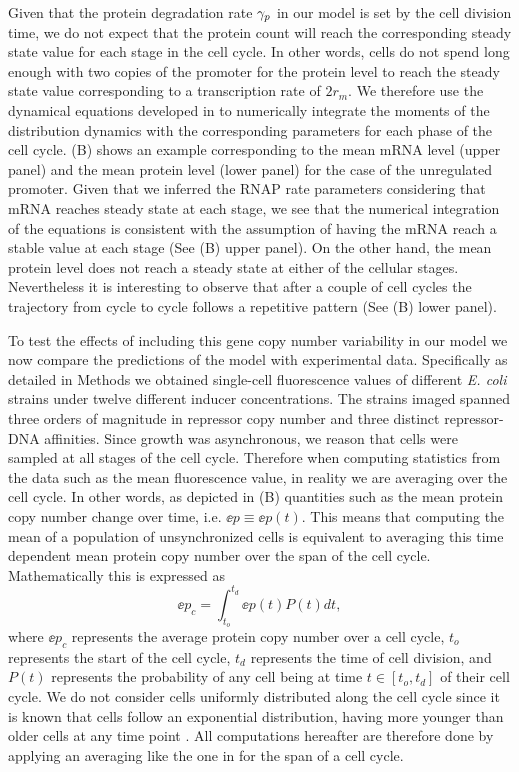 Given that the protein degradation rate $\gamma _p$ in our model is set by the cell
division time, we do not expect that the protein count will reach the
corresponding steady state value for each stage in the cell cycle. In other
words, cells do not spend long enough with two copies of the promoter for the
protein level to reach the steady state value corresponding to a transcription
rate of $2 r_m$. We therefore use the dynamical equations developed in
 to numerically integrate the moments of the distribution
dynamics with the corresponding parameters for each phase of the cell cycle.
(B) shows an example corresponding to the mean mRNA level
(upper panel) and the mean protein level (lower panel) for the case of the
unregulated promoter. Given that we inferred the RNAP rate parameters
considering that mRNA reaches steady state at each stage, we see that the
numerical integration of the equations is consistent with the assumption of
having the mRNA reach a stable value at each stage (See
(B) upper panel). On the other hand, the mean protein
level does not reach a steady state at either of the cellular stages.
Nevertheless it is interesting to observe that after a couple of cell cycles the
trajectory from cycle to cycle follows a repetitive pattern (See
(B) lower panel).

To test the effects of including this gene copy number variability in our model
we now compare the predictions of the model with experimental data. Specifically
as detailed in Methods we obtained single-cell fluorescence values of
different {\it E. coli} strains under twelve different inducer concentrations.
The strains imaged spanned three orders of magnitude in repressor copy number
and three distinct repressor-DNA affinities. Since growth was asynchronous, we
reason that cells were sampled at all stages of the cell cycle. Therefore when
computing statistics from the data such as the mean fluorescence value, in
reality we are averaging over the cell cycle. In other words, as depicted in
(B) quantities such as the mean protein copy number change
over time, i.e. $\ee{p} \equiv \ee{p(t)}$. This means that computing the mean of
a population of unsynchronized cells is equivalent to averaging this time
dependent mean protein copy number over the span of the cell cycle.
Mathematically this is expressed as
\begin{equation}
	\ee{p}_c = \int_{t_o}^{t_d} \ee{p(t)} P(t) dt,
	\label{eq_time_avg}
\end{equation}
where $\ee{p}_c$ represents the average protein copy number over a cell cycle,
$t_o$ represents the start of the cell cycle, $t_d$ represents the time of cell
division, and $P(t)$ represents the probability of any cell being at time $t \in
[t_o, t_d]$ of their cell cycle. We do not consider cells uniformly distributed
along the cell cycle since it is known that cells follow an exponential
distribution, having more younger than older cells at any time point
\cite{Powell1956}. All computations hereafter are therefore done by applying an
averaging like the one in  for the span of a cell cycle.

